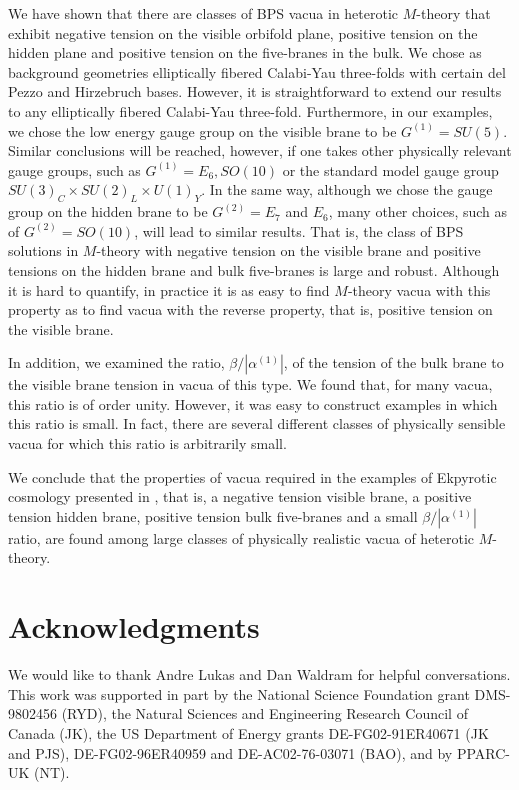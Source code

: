 \documentclass[a4paper,12pt]{article}
\numberwithin{equation}{section}
\theoremstyle{plain}
\begin{document}
We have shown that there are classes of BPS vacua in
heterotic $M$-theory that exhibit negative tension on the visible orbifold
plane, positive tension on the hidden plane and positive tension on the
five-branes in the bulk. We chose as background geometries 
elliptically fibered Calabi-Yau three-folds with certain del Pezzo and 
Hirzebruch bases. However, it is straightforward to extend our results to any 
elliptically fibered Calabi-Yau three-fold. Furthermore, in our examples,
we chose the low energy gauge group on the visible brane to be
$G^{(1)}=SU(5)$. Similar conclusions will be reached, however, if one takes
other physically relevant gauge groups, such as $G^{(1)}=E_{6}, SO(10)$ or the
standard model gauge group $SU(3)_{C} \times SU(2)_{L} \times U(1)_{Y}$.
In the same way, although we chose the gauge group on the hidden
brane to be $G^{(2)}=E_{7}$ and $E_{6}$, many other choices, such as of
$G^{(2)}=SO(10)$, will lead to similar results. That is, the class of 
BPS solutions in $M$-theory with
negative tension on the visible brane and positive tensions on the hidden
brane and bulk five-branes is large and robust. Although it is hard to
quantify, in practice it is as easy to find $M$-theory vacua with this property as
to find vacua with the reverse property, that is,  positive tension on the visible
brane.

In addition, we examined the ratio, $\beta/|\alpha^{(1)}|$, of the tension of
the bulk brane to the visible brane tension in vacua of this type. 
We found that, for many vacua, this
ratio is of order unity. However, it was easy to construct examples in
which this ratio is small. In fact, there are several different classes of
physically sensible vacua for which this ratio is arbitrarily small.

We conclude that the properties of vacua required in the examples
of Ekpyrotic cosmology presented in \cite{EU}, that is, a negative tension 
visible brane, a positive tension hidden brane, positive tension bulk five-branes
and a small $\beta/|\alpha^{(1)}|$ ratio, are found among large classes of physically
realistic vacua of heterotic $M$-theory.


\bigskip
\bigskip
\section*{Acknowledgments}
We would like to thank Andre Lukas and Dan Waldram for helpful conversations.
This work was supported in part by the National Science Foundation grant
DMS-9802456 (RYD), the Natural Sciences and 
Engineering Research Council of Canada (JK),
the US Department of Energy grants DE-FG02-91ER40671 (JK and PJS), 
DE-FG02-96ER40959 and DE-AC02-76-03071 (BAO), and by PPARC-UK (NT). 
\bigskip
    
\end{document}
